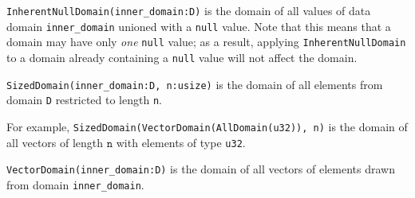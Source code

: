 \documentclass{article}
\begin{document}
\begin{definition} 
    \texttt{InherentNullDomain(inner\_domain:D)} is the domain of all values of data domain \texttt{inner\_domain} unioned with a \texttt{null} value. Note that this means that a domain may have only \emph{one} \texttt{null} value; as a result, applying \texttt{InherentNullDomain} to a domain already containing a \texttt{null} value will not affect the domain. 
\end{definition}
\begin{definition}
    \texttt{SizedDomain(inner\_domain:D, n:usize)} is the domain of all elements from domain \texttt{D} restricted to length \texttt{n}. 
\end{definition}
For example, \texttt{SizedDomain(VectorDomain(AllDomain(u32)), n)} is the domain of all vectors of length $\texttt{n}$ with elements of type \texttt{u32}.
\begin{definition}
\texttt{VectorDomain(inner\_domain:D)} is the domain of all vectors of elements drawn from domain \texttt{inner\_domain}. 
\end{definition}

\end{document}
